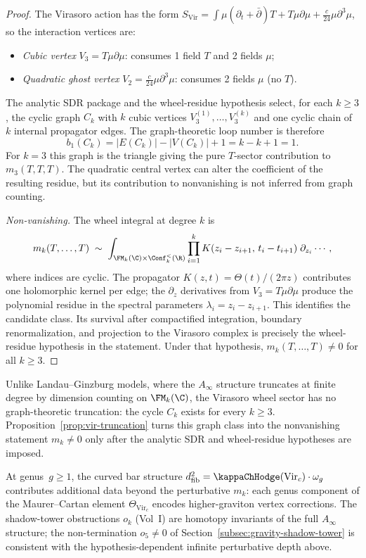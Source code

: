 \begin{proof}
The Virasoro action has the form $S_{\mathrm{Vir}} = \int \mu(\partial_t + \bar\partial) T + T\mu\partial\mu + \tfrac{c}{24}\mu\partial^3\mu$, so the interaction vertices are:
\begin{itemize}
\item \emph{Cubic vertex} $V_3 = T\mu\partial\mu$: consumes 1 field $T$ and 2 fields $\mu$;
\item \emph{Quadratic ghost vertex} $V_2 = \tfrac{c}{24}\mu\partial^3\mu$: consumes 2 fields $\mu$ (no $T$).
\end{itemize}

The analytic SDR package and the wheel-residue hypothesis select, for
each $k\ge3$, the cyclic graph $C_k$ with $k$ cubic vertices
$V_3^{(1)},\ldots,V_3^{(k)}$ and one cyclic chain of $k$ internal
propagator edges. The graph-theoretic loop number is therefore
\[
b_1(C_k)=|E(C_k)|-|V(C_k)|+1=k-k+1=1.
\]
For $k=3$ this graph is the triangle giving the pure $T$-sector
contribution to $m_3(T,T,T)$. The quadratic central vertex can alter
the coefficient of the resulting residue, but its contribution to
nonvanishing is not inferred from graph counting.

\emph{Non-vanishing.} The wheel integral at degree $k$ is
\[
m_k(T, \ldots, T) \;\sim\; \int_{\FM_k(\C) \times \Conf_k^{<}(\R)}
 \prod_{i=1}^k K(z_i - z_{i+1},\, t_i - t_{i+1})\; \partial_{z_i}\cdots,
\]
where indices are cyclic. The propagator $K(z,t) = \Theta(t)/(2\pi z)$
contributes one holomorphic kernel per edge; the
$\partial_z$ derivatives from $V_3 = T\mu\partial\mu$ produce the
polynomial residue in the spectral parameters
$\lambda_i = z_i - z_{i+1}$. This identifies the candidate class. Its
survival after compactified integration, boundary renormalization, and
projection to the Virasoro complex is precisely the wheel-residue
hypothesis in the statement. Under that hypothesis,
$m_k(T,\ldots,T)\ne0$ for all $k\ge3$.
\end{proof}

\begin{remark}
Unlike Landau--Ginzburg models, where the $A_\infty$ structure
truncates at finite degree by dimension counting on $\FM_k(\C)$,
the Virasoro wheel sector has no graph-theoretic truncation: the
cycle $C_k$ exists for every $k\ge3$. Proposition~\ref{prop:vir-truncation}
turns this graph class into the nonvanishing statement
$m_k\ne0$ only after the analytic SDR and wheel-residue hypotheses are
imposed.

At genus~$g \ge 1$, the curved bar structure
$d^2_{\mathrm{fib}} = \kappaChHodge(\mathrm{Vir}_c) \cdot \omega_g$
contributes additional data beyond the perturbative $m_k$: each
genus component of the Maurer--Cartan element $\Theta_{\mathrm{Vir}_c}$
encodes higher-graviton vertex corrections. The shadow-tower
obstructions $o_k$ (Vol~I) are homotopy invariants of the full
$A_\infty$ structure; the non-termination $o_5 \ne 0$ of
Section~\ref{subsec:gravity-shadow-tower} is consistent with the
hypothesis-dependent infinite perturbative depth above.
\end{remark}

